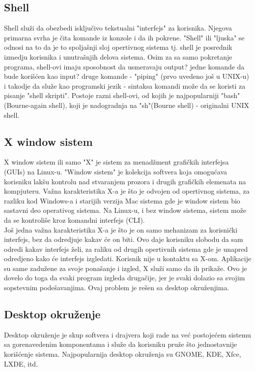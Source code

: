 \subsection{Shell}
Shell služi da obezbedi isključivo tekstualni "interfejs" za korisnika. Njegova primarna svrha je čita komande iz konzole i da ih pokrene. "Shell" ili "ljuska" se odnosi na to da je to spoljašnji sloj opertivnog sistema tj. shell je posrednik izmedju korisnika i unutrašnjih delova sistema. Osim za sa samo pokretanje programa, shell-ovi imaju sposobnost da usmeravaju output? jedne komande da bude korišćen kao input? druge komande - "piping" (prvo uvedeno još u UNIX-u) i takodje da služe kao programski jezik - sintaksa komandi može da se koristi za pisanje "shell skripti". Postoje razni shell-ovi, od kojih je najpopularniji "bash"(Bourne-again shell),  koji je nadogradnja na "sh"(Bourne shell) - originalni UNIX shell.
\subsection{X window sistem}
X window sistem ili samo "X" je sistem za menadžment grafičkih interfejsa (GUIs) na Linux-u. "Window sistem" je kolekcija softvera koja omogućava korisniku lakšu kontrolu nad stvaranjem prozora i drugih grafičkih elemenata na kompjuteru. Važna karakteristika X-a je što je odvojen od opertivnog sistema, za razliku kod Windows-a i starijih verzija Mac sistema gde je window sistem bio sastavni deo operativog sistema. Na Linux-u, i bez window sistema, sistem može da se kontroliše kroz komandni interfejs (CLI).\\
Još jedna važna karakteristika X-a je što je on samo mehanizam za korisnički interfejs, bez da odredjuje kakav će on biti. Ovo daje korisniku slobodu da sam odredi kakav interfejs želi, za raliku od drugih opertivnih sistema gde je unapred odredjeno kako će interfejs izgledati. Korisnik nije u kontaktu sa X-om. Aplikacije su same zadužene za svoje ponašanje i izgled, X služi samo da ih prikaže. Ovo je dovelo do toga da svaki program izgleda drugačije, jer je svaki dolazio sa svojim sopstevnim podešavanjima. Ovaj problem je rešen sa desktop okruženjima.
\subsection{Desktop okruženje}
Desktop okruženje je skup softvera i drajvera koji rade na već postojećem sistemu sa gorenavedenim komponentama i služe da korisniku pruže što jednostavnije korišćenje sistema. Najpopularnija desktop okruženja su GNOME, KDE, Xfce, LXDE, itd.